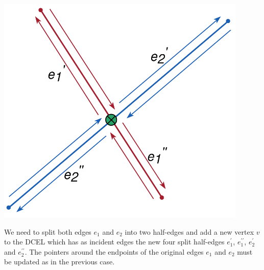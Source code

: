 \begin{minipage}{0.3\textwidth}
    \centering
    \includegraphics[width=0.9\textwidth]{images/int2.png}
\end{minipage}\hfill
\begin{minipage}{0.7\textwidth}
    We need to split both edges $e_1$ and $e_2$ into two half-edges and add a new vertex $v$ to the DCEL which has as incident edges the new four split half-edges $e_1^{\prime}$, $e_1^{\prime\prime}$, $e_2^{\prime}$ and $e_2^{\prime\prime}$. The pointers around the endpoints of the original edges $e_1$ and $e_2$ must be updated as in the previous case.
\end{minipage}
\break

